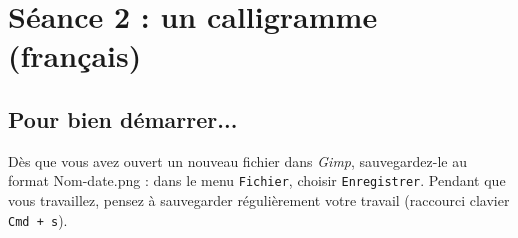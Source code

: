 %
%
%










\newpage


\section{Séance 2 : un calligramme (français)}\label{ficheImage4e1}


\subsection{Pour bien démarrer...}

Dès que vous avez ouvert un nouveau fichier dans \emph{Gimp}, sauvegardez-le au format Nom-date.png : dans le menu \texttt{Fichier}, choisir \texttt{Enregistrer}. Pendant que vous travaillez, pensez à sauvegarder régulièrement votre travail (raccourci clavier \texttt{Cmd + s}).   

